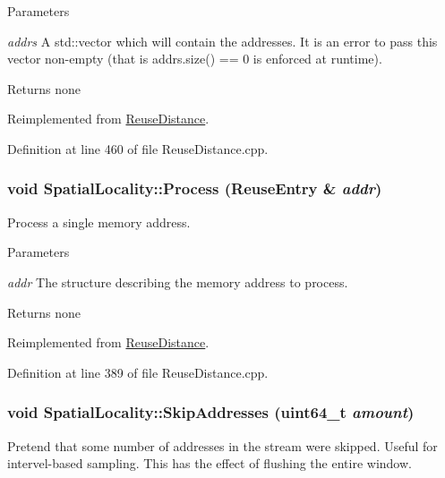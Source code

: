 \begin{DoxyParams}{Parameters}
\item[{\em addrs}]A std::vector which will contain the addresses. It is an error to pass this vector non-\/empty (that is addrs.size() == 0 is enforced at runtime).\end{DoxyParams}
\begin{DoxyReturn}{Returns}
none 
\end{DoxyReturn}


Reimplemented from \hyperlink{class_reuse_distance_acc4885040a8a518fc10b5aa4da7d777a}{ReuseDistance}.



Definition at line 460 of file ReuseDistance.cpp.

\hypertarget{class_spatial_locality_a72a96a67e1791851927dbf3e5ceb206f}{
\subsubsection[{Process}]{\setlength{\rightskip}{0pt plus 5cm}void SpatialLocality::Process ({\bf ReuseEntry} \& {\em addr})}}
\label{class_spatial_locality_a72a96a67e1791851927dbf3e5ceb206f}
Process a single memory address.


\begin{DoxyParams}{Parameters}
\item[{\em addr}]The structure describing the memory address to process.\end{DoxyParams}
\begin{DoxyReturn}{Returns}
none 
\end{DoxyReturn}


Reimplemented from \hyperlink{class_reuse_distance_a4ff6b77022ce62e0fdefa5cc297b932a}{ReuseDistance}.



Definition at line 389 of file ReuseDistance.cpp.

\hypertarget{class_spatial_locality_acdfe7e6ac7891c4673cb7023af7227e0}{
\subsubsection[{SkipAddresses}]{\setlength{\rightskip}{0pt plus 5cm}void SpatialLocality::SkipAddresses (uint64\_\-t {\em amount})}}
\label{class_spatial_locality_acdfe7e6ac7891c4673cb7023af7227e0}
Pretend that some number of addresses in the stream were skipped. Useful for intervel-\/based sampling. This has the effect of flushing the entire window.


